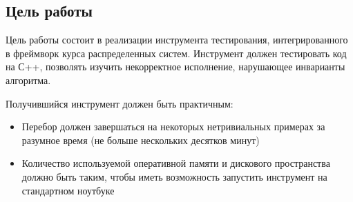 \subsection{Цель работы}

Цель работы состоит в реализации инструмента тестирования, интегрированного в фреймворк курса распределенных систем. Инструмент должен тестировать код на С++, позволять изучить некорректное исполнение, нарушающее инварианты алгоритма.

Получившийся инструмент должен быть практичным:
\begin{itemize}
    \item Перебор должен завершаться на некоторых нетривиальных примерах за разумное время (не больше нескольких десятков минут)
    \item Количество используемой оперативной памяти и дискового пространства должно быть таким, чтобы иметь возможность запустить инструмент на стандартном ноутбуке
\end{itemize}
